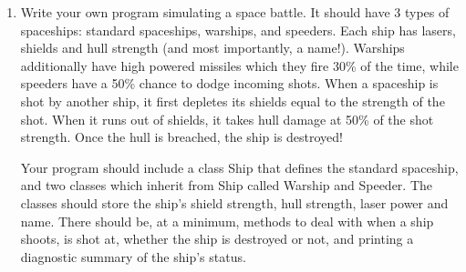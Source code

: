 \documentclass[]{article}
\begin{document}
\begin{enumerate}


\item Write your own program simulating a space battle. It should have 3 types of spaceships: standard spaceships, warships, and speeders. Each ship has lasers, shields and hull strength (and most importantly, a name!). Warships additionally have high powered missiles which they fire 30\% of the time, while speeders have a 50\% chance to dodge incoming shots. When a spaceship is shot by another ship, it first depletes its shields equal to the strength of the shot. When it runs out of shields, it takes hull damage at 50\% of the shot strength. Once the hull is breached, the ship is destroyed!

Your program should include a class Ship that defines the standard spaceship, and two classes which inherit from Ship called Warship and Speeder. The classes should store the ship's shield strength, hull strength, laser power and name. There should be, at a minimum, methods to deal with when a ship shoots, is shot at, whether the ship is destroyed or not, and printing a diagnostic summary of the ship's status. 


\end{enumerate}
\end{document}
